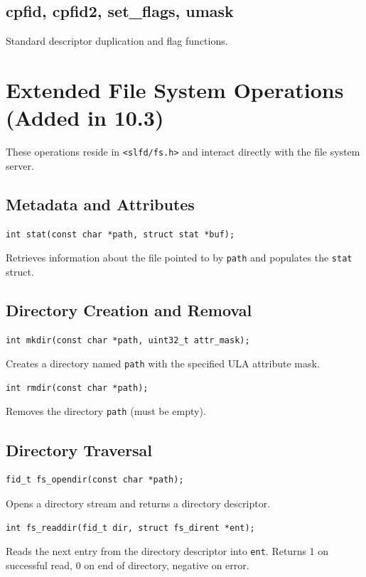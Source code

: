 \documentclass[12pt,a4paper]{article}
\begin{document}
\subsection{cpfid, cpfid2, set\_flags, umask}
Standard descriptor duplication and flag functions.

\section{Extended File System Operations (Added in 10.3)}
These operations reside in \texttt{<slfd/fs.h>} and interact directly with the file system server.

\subsection{Metadata and Attributes}
\begin{verbatim}
int stat(const char *path, struct stat *buf);
\end{verbatim}
Retrieves information about the file pointed to by \texttt{path} and populates the \texttt{stat} struct.

\subsection{Directory Creation and Removal}
\begin{verbatim}
int mkdir(const char *path, uint32_t attr_mask);
\end{verbatim}
Creates a directory named \texttt{path} with the specified ULA attribute mask.

\begin{verbatim}
int rmdir(const char *path);
\end{verbatim}
Removes the directory \texttt{path} (must be empty).

\subsection{Directory Traversal}
\begin{verbatim}
fid_t fs_opendir(const char *path);
\end{verbatim}
Opens a directory stream and returns a directory descriptor.

\begin{verbatim}
int fs_readdir(fid_t dir, struct fs_dirent *ent);
\end{verbatim}
Reads the next entry from the directory descriptor into \texttt{ent}. Returns 1 on successful read, 0 on end of directory, negative on error.
\end{document}
